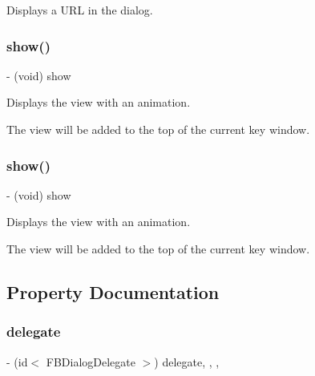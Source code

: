Displays a U\+RL in the dialog. \mbox{\label{interfaceFBDialog_a657a94d26c8dd3dfbe60b64c6bcbf411}} 
\subsubsection{\texorpdfstring{show()}{show()}\hspace{0.1cm}{\footnotesize\ttfamily [1/2]}}
{\footnotesize\ttfamily -\/ (void) show \begin{DoxyParamCaption}{ }\end{DoxyParamCaption}}

Displays the view with an animation.

The view will be added to the top of the current key window. \mbox{\label{interfaceFBDialog_a657a94d26c8dd3dfbe60b64c6bcbf411}} 
\subsubsection{\texorpdfstring{show()}{show()}\hspace{0.1cm}{\footnotesize\ttfamily [2/2]}}
{\footnotesize\ttfamily -\/ (void) show \begin{DoxyParamCaption}{ }\end{DoxyParamCaption}}

Displays the view with an animation.

The view will be added to the top of the current key window. 

\subsection{Property Documentation}
\mbox{\label{interfaceFBDialog_a158079f95fccddae603fd2c01a230e38}} 
\subsubsection{\texorpdfstring{delegate}{delegate}}
{\footnotesize\ttfamily -\/ (id$<$ F\+B\+Dialog\+Delegate $>$) delegate\hspace{0.3cm}{\ttfamily [read]}, {\ttfamily [write]}, {\ttfamily [nonatomic]}, {\ttfamily [assign]}}

